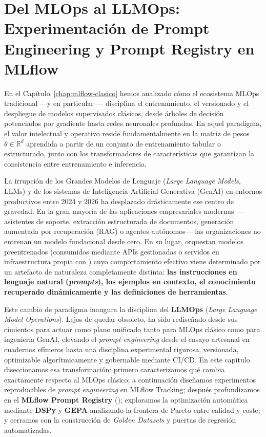 
\chapter[LLMOps, Prompt Engineering y Prompt Registry]{Del MLOps al LLMOps: Experimentación de Prompt Engineering y Prompt Registry en MLflow}\label{chap:mlflow-prompting}

En el Capítulo~\ref{chap:mlflow-clasico} hemos analizado cómo el ecosistema MLOps tradicional ---y en particular --- disciplina el entrenamiento, el versionado y el despliegue de modelos supervisados clásicos, desde árboles de decisión potenciados por gradiente hasta redes neuronales profundas. En aquel paradigma, el valor intelectual y operativo reside fundamentalmente en la matriz de pesos $\theta \in \mathbb{R}^d$ aprendida a partir de un conjunto de entrenamiento tabular o estructurado, junto con los transformadores de características que garantizan la consistencia entre entrenamiento e inferencia.

La irrupción de los Grandes Modelos de Lenguaje (\textit{Large Language Models}, LLMs) y de los sistemas de Inteligencia Artificial Generativa (GenAI) en entornos productivos entre 2024 y 2026 ha desplazado drásticamente ese centro de gravedad. En la gran mayoría de las aplicaciones empresariales modernas ---asistentes de soporte, extracción estructurada de documentos, generación aumentada por recuperación (RAG) o agentes autónomos--- las organizaciones no entrenan un modelo fundacional desde cero. En su lugar, orquestan modelos preentrenados (consumidos mediante APIs gestionadas o servidos en infraestructura propia con ) cuyo comportamiento efectivo viene determinado por un artefacto de naturaleza completamente distinta: \textbf{las instrucciones en lenguaje natural (\textit{prompts}), los ejemplos en contexto, el conocimiento recuperado dinámicamente y las definiciones de herramientas}.

Este cambio de paradigma inaugura la disciplina del \textbf{LLMOps} (\textit{Large Language Model Operations}). Lejos de quedar obsoleto,  ha sido rediseñado desde sus cimientos para actuar como plano unificado tanto para MLOps clásico como para ingeniería GenAI, elevando el \textit{prompt engineering} desde el ensayo artesanal en cuadernos efímeros hasta una disciplina experimental rigurosa, versionada, optimizable algorítmicamente y gobernable mediante CI/CD. En este capítulo diseccionamos esa transformación: primero caracterizamos qué cambia exactamente respecto al MLOps clásico; a continuación diseñamos experimentos reproducibles de \textit{prompt engineering} en MLflow Tracking; después profundizamos en el \textbf{MLflow Prompt Registry} (); exploramos la optimización automática mediante \textbf{DSPy} y \textbf{GEPA} analizando la frontera de Pareto entre calidad y coste; y cerramos con la construcción de \textit{Golden Datasets} y puertas de regresión automatizadas.

